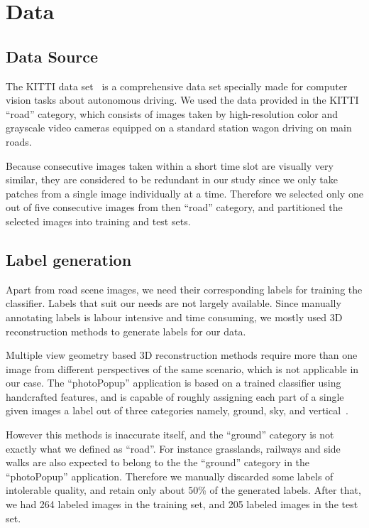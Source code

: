 \section{Data}
\label{sec:Data}

\subsection{Data Source}
\label{sec:Data Source}
The KITTI data set~\cite{Geiger2013IJRR} is a comprehensive data set specially made for computer vision tasks about autonomous driving. We used the data provided in the KITTI ``road'' category, which consists of images taken by high-resolution color and grayscale video cameras equipped on a standard station wagon driving on main roads.

Because consecutive images taken within a short time slot are visually very similar, they are considered to be redundant in our study since we only take patches from a single image individually at a time. Therefore we selected only one out of five consecutive images from then ``road'' category, and partitioned the selected images into training and test sets.

\subsection{Label generation}
\label{sec:Label generation}
Apart from road scene images, we need their corresponding labels for training the classifier. Labels that suit our needs are not largely available. Since manually annotating labels is labour intensive and time consuming, we mostly used 3D reconstruction methods to generate labels for our data. 

Multiple view geometry based 3D reconstruction methods require more than one image from different perspectives of the same scenario, which is not applicable in our case. The ``photoPopup'' application is based on a trained classifier using handcrafted features, and is capable of roughly assigning each part of a single given images a label out of three categories namely, ground, sky, and vertical~\cite{hoiem2005automatic}. 

However this methods is inaccurate itself, and the ``ground'' category is not exactly what we defined as ``road''. For instance grasslands, railways and side walks are also expected to belong to the the ``ground'' category in the ``photoPopup'' application.  Therefore we manually discarded some labels of intolerable quality, and retain only about 50\% of the generated labels. After that, we had 264 labeled images in the training set, and 205 labeled images in the test set.

